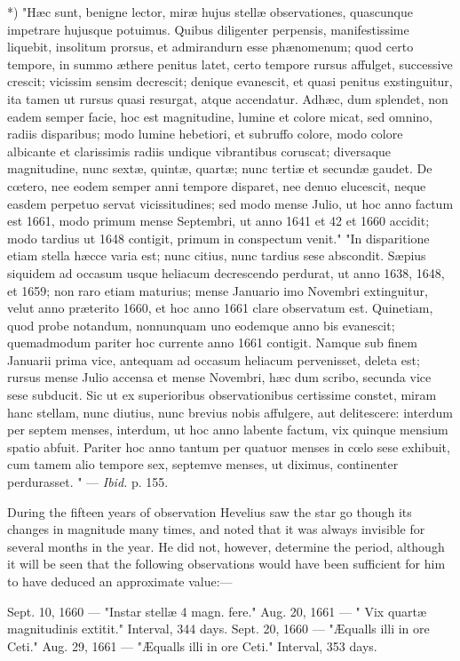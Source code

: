 \documentclass[a4paper, 12pt, oneside, polutonikogreek, english]{article}
\begin{document}
*) "Hæc sunt, benigne lector, miræ hujus stellæ observationes, quascunque impetrare hujusque potuimus. Quibus diligenter perpensis, manifestissime liquebit, insolitum prorsus, et admirandurn esse phænomenum; quod certo tempore, in summo æthere penitus latet, certo tempore rursus affulget, successive crescit; vicissim sensim decrescit; denique evanescit, et quasi penitus exstinguitur, ita tamen ut rursus quasi resurgat, atque accendatur. Adhæc, dum splendet, non eadem semper facie, hoc est magnitudine, lumine et colore micat, sed omnino, radiis disparibus; modo lumine hebetiori, et subruffo colore, modo colore albicante et clarissimis radiis undique vibrantibus coruscat; diversaque magnitudine, nunc sextæ, quintæ, quartæ; nunc tertiæ et secundæ gaudet. De cœtero, nee eodem semper anni tempore disparet, nee denuo elucescit, neque easdem perpetuo servat vicissitudines; sed modo mense Julio, ut hoc anno factum est 1661, modo primum mense Septembri, ut anno 1641 et 42 et 1660 accidit; modo tardius ut 1648 contigit, primum in conspectum venit." "In disparitione etiam stella hæcce varia est; nunc citius, nunc tardius sese abscondit. Sæpius siquidem ad occasum usque heliacum decrescendo perdurat, ut anno 1638, 1648, et 1659; non raro etiam maturius; mense Januario imo Novembri extinguitur, velut anno præterito 1660, et hoc anno 1661 clare observatum est. Quinetiam, quod probe notandum, nonnunquam uno eodemque anno bis evanescit; quemadmodum pariter hoc currente anno 1661 contigit. Namque sub finem Januarii prima vice, antequam ad occasum heliacum pervenisset, deleta est; rursus mense Julio accensa et mense Novembri, hæc dum scribo, secunda vice sese subducit. Sic ut ex superioribus observationibus certissime constet, miram hanc stellam, nunc diutius, nunc brevius nobis affulgere, aut delitescere: interdum per septem menses, interdum, ut hoc anno labente factum, vix quinque mensium spatio abfuit. Pariter hoc anno tantum per quatuor menses in cœlo sese exhibuit, cum tamem alio tempore sex, septemve menses, ut diximus, continenter perdurasset. " --- \emph{Ibid.} p. 155.

During the fifteen years of observation Hevelius saw the star go though its changes in magnitude many times, and noted that it was always invisible for several months in the year. He did not, however, determine the period, although it will be seen that the following observations would have been sufficient for him to have deduced an approximate value:---

Sept. 10, 1660 --- "Instar stellæ 4 magn. fere." Aug. 20, 1661 --- " Vix quartæ magnitudinis extitit." Interval, 344 days. Sept. 20, 1660 --- "Æqualls illi in ore Ceti." Aug. 29, 1661 --- "Æqualls illi in ore Ceti." Interval, 353 days.
\end{document}

